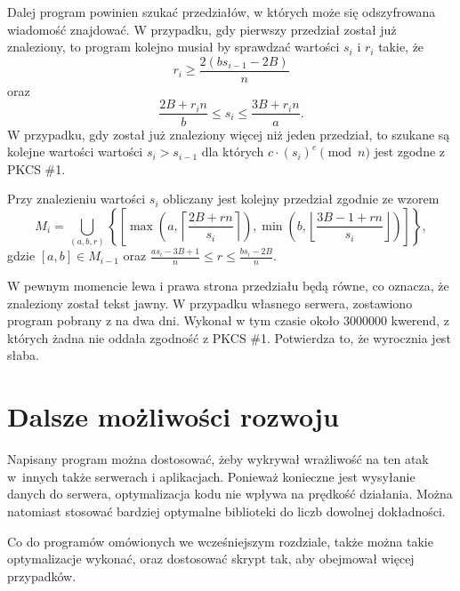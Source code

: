 \documentclass[12pt,twoside,a4]{mwbk}
\theoremstyle{definition}
\begin{document}
Dalej program powinien szukać przedziałów, w których może się odszyfrowana wiadomość znajdować. W przypadku, gdy pierwszy przedział został już znaleziony, to program kolejno musiał by sprawdzać wartości $s_i$ i $r_i$ takie, że
\[ r_i \geq \frac{2 (bs_{i-1} -2B)}{n} \] oraz
\[ \frac{2B + r_i n}{b} \leq s_i \leq \frac{3B + r_i n}{a}. \]
W przypadku, gdy został już znaleziony więcej niż jeden przedział, to szukane są kolejne wartości wartości $s_i > s_{i-1}$ dla których $c \cdot (s_i)^e \pmod{n}$ jest zgodne z PKCS \#1. \\ \par
Przy znalezieniu wartości $s_i$ obliczany jest kolejny przedział zgodnie ze wzorem
\[ M_i =  \bigcup_{(a,b,r)} \left\{\left[ \max\left(a,\left\lceil\frac{2B+rn}{s_i}\right\rceil\right), \min\left(b,\left\lfloor\frac{3B-1+rn}{s_i}\right\rfloor\right) \right]\right\}, \]
gdzie $[a,b] \in M_{i-1}$ oraz $\frac{as_i-3B+1}{n} \leq r \leq \frac{bs_i-2B}{n}$. \\ \par
W pewnym momencie lewa i prawa strona przedziału będą równe, co oznacza, że znaleziony został tekst jawny. W przypadku własnego serwera, zostawiono program pobrany z \cite{robot-attack} na dwa dni. Wykonał w tym czasie około 3000000 kwerend, z których żadna nie oddała zgodność z PKCS \#1. Potwierdza to, że wyrocznia jest słaba. 


\section{Dalsze możliwości rozwoju}
Napisany program można dostosować, żeby wykrywał wrażliwość na ten atak w~innych także serwerach i aplikacjach. Ponieważ konieczne jest wysyłanie danych do serwera, optymalizacja kodu nie wpływa na prędkość działania. Można natomiast stosować bardziej optymalne biblioteki do liczb dowolnej dokładności. \\ \par
Co do programów omówionych we wcześniejszym rozdziale, także można takie optymalizacje wykonać, oraz dostosować skrypt tak, aby obejmował więcej przypadków.



\end{document}
